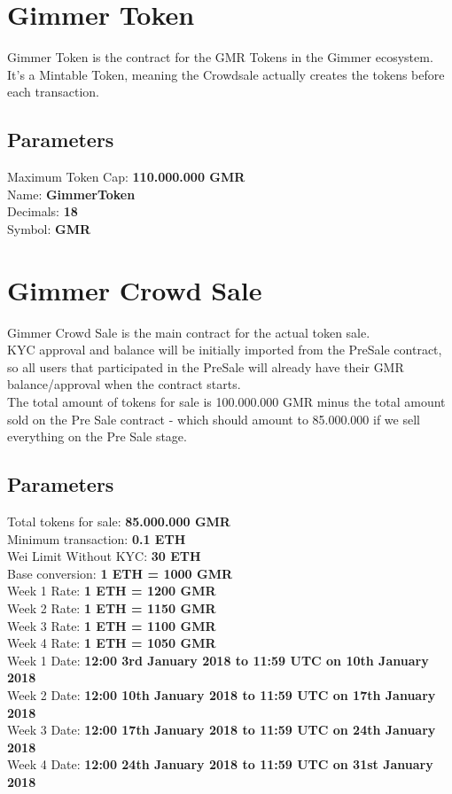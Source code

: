 \documentclass[11pt]{article} %
\begin{document}
\section{Gimmer Token}
Gimmer Token is the contract for the GMR Tokens in the Gimmer ecosystem.\\
It's a Mintable Token, meaning the Crowdsale actually creates the tokens before each transaction.\\

\subsection{Parameters}
Maximum Token Cap: \textbf{110.000.000 GMR}\\
Name: \textbf{GimmerToken}\\
Decimals: \textbf{18}\\
Symbol: \textbf{GMR}

\section{Gimmer Crowd Sale}
Gimmer Crowd Sale is the main contract for the actual token sale.\\
KYC approval and balance will be initially imported from the PreSale contract, so all users that participated in the PreSale will already have their GMR balance/approval when the contract starts.\\
The total amount of tokens for sale is 100.000.000 GMR minus the total amount sold on the Pre Sale contract - which should amount to 85.000.000 if we sell everything on the Pre Sale stage.

\subsection{Parameters}
Total tokens for sale: \textbf{85.000.000 GMR}\\
Minimum transaction: \textbf{0.1 ETH}\\
Wei Limit Without KYC: \textbf{30 ETH}\\
Base conversion: \textbf{1 ETH = 1000 GMR}\\
Week 1 Rate: \textbf{1 ETH = 1200 GMR}\\
Week 2 Rate: \textbf{1 ETH = 1150 GMR}\\
Week 3 Rate: \textbf{1 ETH = 1100 GMR}\\
Week 4 Rate: \textbf{1 ETH = 1050 GMR}\\
Week 1 Date: \textbf{12:00 3rd January 2018 to 11:59 UTC on 10th January 2018}\\
Week 2 Date: \textbf{12:00 10th January 2018 to 11:59 UTC on 17th January 2018}\\
Week 3 Date: \textbf{12:00 17th January 2018 to 11:59 UTC on 24th January 2018}\\
Week 4 Date: \textbf{12:00 24th January 2018 to 11:59 UTC on 31st January 2018}\\
\end{document}
